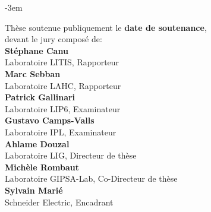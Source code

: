 \begin{titlepage}
\begin{adjustwidth}{}{-3em}
\begin{flushleft}
\begin{flushright}
\begin{minipage}{\leftshift}
\begin{flushleft}
{Thèse soutenue publiquement le \textbf{date de soutenance},\\ devant le jury composé de:}\\[\espvert]
{\textbf{Stéphane Canu}}\\
{Laboratoire LITIS, Rapporteur}\\
{\textbf{Marc Sebban}}\\
{Laboratoire LAHC, Rapporteur}\\
{\textbf{Patrick Gallinari}}\\
{Laboratoire LIP6, Examinateur }\\ %
{\textbf{Gustavo Camps-Valls}}\\
{Laboratoire IPL, Examinateur}\\
{\textbf{Ahlame Douzal}}\\
{Laboratoire LIG, Directeur de thèse}\\
{\textbf{Michèle Rombaut}}\\
{Laboratoire GIPSA-Lab, Co-Directeur de thèse}\\
{\textbf{Sylvain Mari\'{e}}}\\
{Schneider Electric, Encadrant}\\

\end{flushleft}
\end{minipage}
\end{flushright}
\vfill
\end{flushleft}
\end{adjustwidth}
\end{titlepage}
\setlength{\parskip}{10pt}
\endgroup

\cleardoublepage


